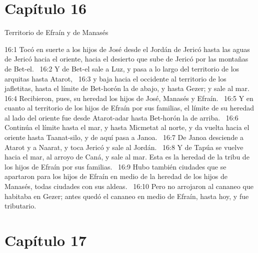 \section*{Capítulo 16 }
Territorio de Efraín y de Manasés  

16:1 Tocó en suerte a los hijos de José desde el Jordán de Jericó hasta las aguas de Jericó hacia el oriente, hacia el desierto que sube de Jericó por las montañas de Bet-el.  
16:2 Y de Bet-el sale a Luz, y pasa a lo largo del territorio de los arquitas hasta Atarot,  
16:3 y baja hacia el occidente al territorio de los jafletitas, hasta el límite de Bet-horón la de abajo, y hasta Gezer; y sale al mar.  
16:4 Recibieron, pues, su heredad los hijos de José, Manasés y Efraín.  
16:5 Y en cuanto al territorio de los hijos de Efraín por sus familias, el límite de su heredad al lado del oriente fue desde Atarot-adar hasta Bet-horón la de arriba.  
16:6 Continúa el límite hasta el mar, y hasta Micmetat al norte, y da vuelta hacia el oriente hasta Taanat-silo, y de aquí pasa a Janoa.  
16:7 De Janoa desciende a Atarot y a Naarat, y toca Jericó y sale al Jordán.  
16:8 Y de Tapúa se vuelve hacia el mar, al arroyo de Caná, y sale al mar. Esta es la heredad de la tribu de los hijos de Efraín por sus familias.  
16:9 Hubo también ciudades que se apartaron para los hijos de Efraín en medio de la heredad de los hijos de Manasés, todas ciudades con sus aldeas.  
16:10 Pero no arrojaron al cananeo que habitaba en Gezer; antes quedó el cananeo en medio de Efraín, hasta hoy, y fue tributario.  
\section*{Capítulo 17}

